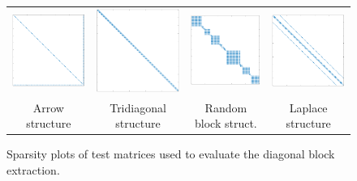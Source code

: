 \begin{figure}
\begin{center}
{\scriptsize
\begin{tabular}{cccc}
\includegraphics[width=.2\columnwidth]{plots/arr.png}
&
\includegraphics[width=.2\columnwidth]{plots/tdg.png}
&
\includegraphics[width=.2\columnwidth]{plots/rnd.png}
&
\includegraphics[width=.2\columnwidth]{plots/lap.png} \\
Arrow structure & Tridiagonal structure & Random block struct. & Laplace structure
\end{tabular}
}
\end{center}
\caption{%
Sparsity plots of test matrices used to evaluate the diagonal block extraction.%
}
\label{fig:sparsityplots}
\end{figure}


